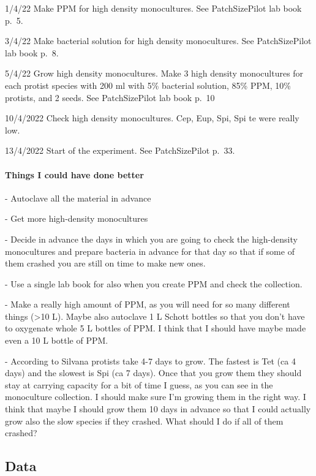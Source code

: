 \documentclass[
]{article}
\begin{document}
1/4/22 Make PPM for high density monocultures. See PatchSizePilot lab
book p.~5.

3/4/22 Make bacterial solution for high density monocultures. See
PatchSizePilot lab book p.~8.

5/4/22 Grow high density monocultures. Make 3 high density monocultures
for each protist species with 200 ml with 5\% bacterial solution, 85\%
PPM, 10\% protists, and 2 seeds. See PatchSizePilot lab book p.~10

10/4/2022 Check high density monocultures. Cep, Eup, Spi, Spi te were
really low.

13/4/2022 Start of the experiment. See PatchSizePilot p.~33.

\hypertarget{things-i-could-have-done-better}{%
\paragraph{Things I could have done
better}\label{things-i-could-have-done-better}}

- Autoclave all the material in advance

- Get more high-density monocultures

- Decide in advance the days in which you are going to check the
high-density monocultures and prepare bacteria in advance for that day
so that if some of them crashed you are still on time to make new ones.

- Use a single lab book for also when you create PPM and check the
collection.

- Make a really high amount of PPM, as you will need for so many
different things (\textgreater10 L). Maybe also autoclave 1 L Schott
bottles so that you don't have to oxygenate whole 5 L bottles of PPM. I
think that I should have maybe made even a 10 L bottle of PPM.

- According to Silvana protists take 4-7 days to grow. The fastest is
Tet (ca 4 days) and the slowest is Spi (ca 7 days). Once that you grow
them they should stay at carrying capacity for a bit of time I guess, as
you can see in the monoculture collection. I should make sure I'm
growing them in the right way. I think that maybe I should grow them 10
days in advance so that I could actually grow also the slow species if
they crashed. What should I do if all of them crashed?

\hypertarget{data}{%
\subsection{Data}\label{data}}
\end{document}
